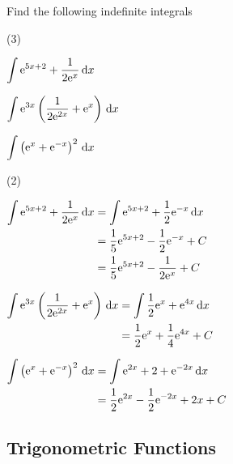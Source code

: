 \documentclass[11pt,a4paper]{book}
\begin{document}
\begin{example}

Find the following indefinite integrals

\begin{tasks}[label=(\alph*),label-width=3.5ex](3)

\task ${\displaystyle \int{\rm e}^{5x+2}+\frac{1}{2\mathrm{e}^{x}}\, \mathrm{d}x}$

\task ${\displaystyle \int{\rm e}^{3x}\left(\frac{1}{2{\rm e}^{2x}}+{\rm e}^{x}\right)\, \mathrm{d}x}$

\task  ${\displaystyle \int\left({\rm e}^{x}+{\rm e}^{-x}\right)^{2}\, \mathrm{d}x}$

\end{tasks}

\Solution

\begin{tasks}[label=(\alph*),label-width=3.5ex,after-item-skip = 1cm](2)

\task
$
\begin{aligned}[t]
\int{\rm e}^{5x+2}+\frac{1}{2\mathrm{e}^{x}}\, \mathrm{d}x & =\int{\rm e}^{5x+2}+\frac{1}{2}{\rm e}^{-x}\, \mathrm{d}x\\
 & =\frac{1}{5}{\rm e}^{5x+2}-\frac{1}{2}{\rm e}^{-x}+C\\
 & =\frac{1}{5}{\rm e}^{5x+2}-\frac{1}{2{\rm e}^{x}}+C
\end{aligned}
$

\task
$
\begin{aligned}[t]
\int{\rm e}^{3x}\left(\frac{1}{2{\rm e}^{2x}}+{\rm e}^{x}\right)\, \mathrm{d}x & =\int\frac{1}{2}{\rm e}^{x}+{\rm e}^{4x}\, \mathrm{d}x\\
 & =\frac{1}{2}{\rm e}^{x}+\frac{1}{4}{\rm e}^{4x}+C
\end{aligned}
$

\task
$
\begin{aligned}[t]
\int\left({\rm e}^{x}+{\rm e}^{-x}\right)^{2}\, \mathrm{d}x & ={\displaystyle \int{\rm e}^{2x}+2+{\rm e}^{-2x}\, \mathrm{d}x}\\
 & =\frac{1}{2}{\rm e}^{2x}-\frac{1}{2}{\rm e}^{-2x}+2x+C
\end{aligned}
$

\end{tasks}


\end{example}


\subsection{Trigonometric Functions }
\end{document}
